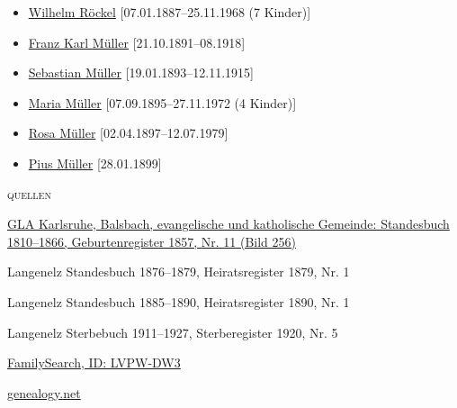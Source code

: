 \begin{person}[
    surname = {Noe},
    givenname = {Rosa},
    suffix = {1857--1920},
    label = {@I387@},
    filename = {Rosa Noe (1857)}
    ]
\begin{itemize}
\item \hyperref[@I472@]{Wilhelm Röckel} [07.01.1887--25.11.1968 (7 Kinder)]
\item \hyperref[@I960@]{Franz Karl Müller} [21.10.1891--08.1918]
\item \hyperref[@I961@]{Sebastian Müller} [19.01.1893--12.11.1915]
\item \hyperref[@I481@]{Maria Müller} [07.09.1895--27.11.1972 (4 Kinder)]
\item \hyperref[@I962@]{Rosa Müller} [02.04.1897--12.07.1979]
\item \hyperref[@I963@]{Pius Müller} [28.01.1899]
\end{itemize}
\medbreak
\textsc{{quellen}}
\begin{enumerate}[label={[\arabic*]}]
\item \href{http://www.landesarchiv-bw.de/plink/?f=4-1120207-256}{GLA Karlsruhe, Balsbach, evangelische und katholische Gemeinde: Standesbuch 1810–1866, Geburtenregister 1857, Nr. 11 (Bild 256)}
\item Langenelz Standesbuch 1876–1879, Heiratsregister 1879, Nr. 1
\item Langenelz Standesbuch 1885–1890, Heiratsregister 1890, Nr. 1
\item Langenelz Sterbebuch 1911–1927, Sterberegister 1920, Nr. 5
\item \href{https://www.familysearch.org/tree/person/details/LVPW-DW3}{FamilySearch, ID: LVPW-DW3}
\item \href{http://gedbas.genealogy.net/person/show/1172957274}{genealogy.net}
\end{enumerate}

\end{person}

